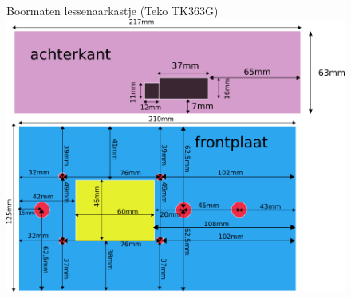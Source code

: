 \documentclass[12pt,a4paper]{report}
\begin{document}
\begin{figure}[ht]
  \captionbox
  {Boormaten lessenaarkastje (Teko TK363G)}
  {\includegraphics[scale=0.7]{images/inbouwmaten_centralekast}}
\end{figure}
\end{document}
